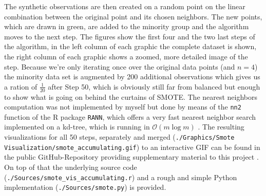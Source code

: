 \documentclass[12pt,a4paper]{article}
\begin{document}
The synthetic observations are then created on a random point on the linear combination between the original point and its chosen neighbors. The new points, which are drawn in green, are added to the minority group and the algorithm moves to the next step. The figures show the first four and the two last steps of the algorithm, in the left column of each graphic the complete dataset is shown, the right column of each graphic shows a zoomed, more detailed image of the step. Because we're only iterating once over the original data points (and $n=4$) the minority data set is augmented by 200 additional observations which gives us a ration of $\frac{1}{20}$ after Step 50, which is obviously still far from balanced but enough to show what is going on behind the curtains of SMOTE. The nearest neighbors computation was not implemented by myself but done by means of the \verb+nn2+ function of the R \nocite{pack:r_base} package \verb+RANN+, which offers a very fast nearest neighbor search implemented on a kd-tree, which is running in $\mathcal{O}(m\log{m})$ \cite{Arya2019}. The resulting visualizations for all 50 steps, separately and merged (\verb+./Graphics/Smote Visualization/smote_accumulating.gif+) to an interactive GIF can be found in the public GitHub-Repository providing supplementary material to this project \cite{publicRepo}. On top of that the underlying source code (\verb+./Sources/smote_vis_accumulating.r+) and a rough and simple Python implementation (\verb+./Sources/smote.py+) is provided.
\end{document}
